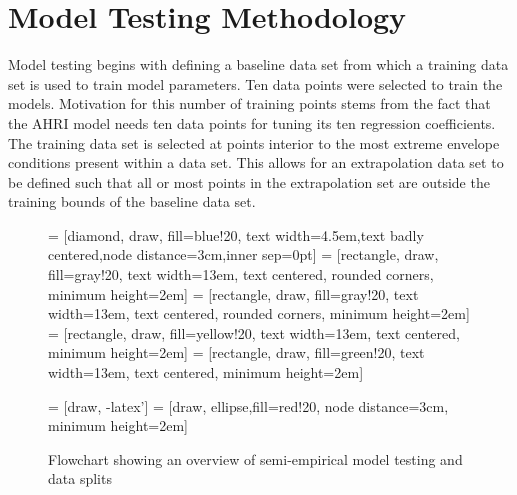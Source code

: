 \documentclass[preprint,11pt,authoryear]{elsarticle}
\begin{document}
\section{Model Testing Methodology}
\label{sec:methodology}
Model testing begins with defining a baseline data set from which a training data set is used to train model parameters. Ten data points were selected to train the models. Motivation for this number of training points stems from the fact that the AHRI model needs ten data points for tuning its ten regression coefficients. The training data set is selected at points interior to the most extreme envelope conditions present within a data set. This allows for an extrapolation data set to be defined such that all or most points in the extrapolation set are outside the training bounds of the baseline data set. 

\begin{figure}[h] %
\label{fig:methodology}
\caption{Flowchart showing an overview of semi-empirical model testing and data splits}
 = [diamond, draw, fill=blue!20, text width=4.5em,text badly 								centered,node distance=3cm,inner sep=0pt]
 = [rectangle, draw, fill=gray!20, text width=13em, text centered, 						rounded corners, minimum height=2em] 
 = [rectangle, draw, fill=gray!20, 
    text width=13em, text centered, rounded corners, minimum height=2em]  
 = [rectangle, draw, fill=yellow!20, 
    text width=13em, text centered, minimum height=2em]
 = [rectangle, draw, fill=green!20, 
    text width=13em, text centered, minimum height=2em]
    
 = [draw, -latex']
 = [draw, ellipse,fill=red!20, node distance=3cm,
    minimum height=2em]
\begin{center}    
\end{center}
\end{figure}
\end{document}
